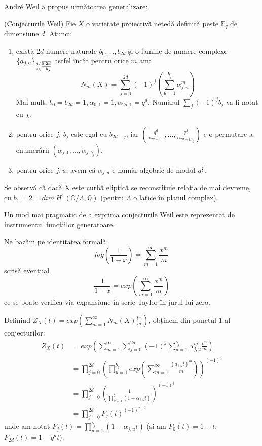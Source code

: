 \documentclass[13pt,openany]{book}
\begin{document}
André Weil a propus următoarea generalizare:
\begin{teo}
(Conjecturile Weil) Fie $X$ o varietate proiectivă netedă definită peste $\mathbb{F}_q$ de dimensiune $d$. Atunci:
\begin{enumerate}
\item există $2d$ numere naturale $b_0,...,b_{2d}$ și o familie de numere complexe $\{a_{j,u}\}_{j\in\overline{0,2d}\atop s\in\overline{1,b_j}}$ astfel încât pentru orice $m$ am:
$$N_m(X)=\sum\limits_{j=0}^{2d} (-1)^j (\sum\limits_{u=1}^{b_j} \alpha_{j,u}^m)$$
Mai mult, $b_0=b_{2d}=1, \alpha_{0,1}=1, \alpha_{2d,1}=q^d$. Numărul $\sum\limits_j (-1)^j b_j$ va fi notat cu $\chi$.
\item pentru orice $j$, $b_j$ este egal cu $b_{2d-j}$, iar $(\frac{q^d}{\alpha_{2d-j,1}},...,\frac{q^d}{\alpha_{2d-j,b_j}})$ e o permutare a enumerării $(\alpha_{j,1},...,\alpha_{j,b_j})$.
\item pentru orice $j,u$, avem că $\alpha_{j,u}$ e număr algebric de modul $q^{\frac{j}{2}}$.
\end{enumerate}
\end{teo}

Se observă că dacă X este curbă eliptică se reconstituie relația de mai devreme, cu $b_1=2=dim\ H^1(\mathbb{C}/\Lambda, \mathbb{Q})$ (pentru $\Lambda$ o latice în planul complex).

Un mod mai pragmatic de a exprima conjecturile Weil este reprezentat de instrumentul funcțiilor generatoare.

Ne bazăm pe identitatea formală:
$$log(\frac{1}{1-x})=\sum\limits_{m=1}^{\infty} \frac{x^m}{m}$$
scrisă eventual
$$\frac{1}{1-x}=exp(\sum\limits_{m=1}^{\infty} \frac{x^m}{m})$$
ce se poate verifica via expansiune în serie Taylor în jurul lui zero.

Definind $Z_X(t) = exp(\sum\limits_{m=1}^{\infty} N_m(X) \frac{t^m}{m})$, obținem din punctul 1 al conjecturilor:
\begin{align*}
Z_X(t)&=exp(\sum\limits_{m=1}^{\infty} \sum\limits_{j=0}^{2d} (-1)^j \sum\limits_{u=1}^{b_j} \alpha_{j,u}^m \frac{t^m}{m})\\
&=\prod\limits_{j=0}^{2d} (\prod_{u=1}^{b_j} exp(\sum\limits_{m=1}^{\infty} \frac{(a_{j,u} t)^m}{m}))^{(-1)^j}\\
&=\prod\limits_{j=0}^{2d} (\frac{1}{\prod\limits_{u=1}^{b_j}(1-\alpha_{j,u}t)})^{(-1)^j}\\
&=\prod\limits_{j=0}^{2d} P_j(t)^{(-1)^{j+1}}
\end{align*}
unde am notat $P_j(t)=\prod\limits_{u=1}^{b_j}(1-\alpha_{j,u}t)$ (și am $P_0(t)=1-t$, $P_{2d}(t)=1-q^dt$).
\end{document}
